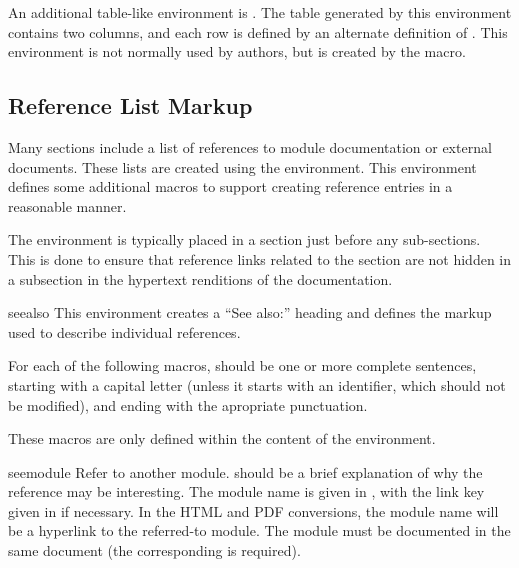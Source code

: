 \documentclass{howto}
\begin{document}
    An additional table-like environment is .  The
    table generated by this environment contains two columns, and each
    row is defined by an alternate definition of
    .  This environment is not normally used by
    authors, but is created by the  macro.


  \subsection{Reference List Markup \label{references}}

    Many sections include a list of references to module documentation
    or external documents.  These lists are created using the
     environment.  This environment defines some
    additional macros to support creating reference entries in a
    reasonable manner.

    The  environment is typically placed in a section
    just before any sub-sections.  This is done to ensure that
    reference links related to the section are not hidden in a
    subsection in the hypertext renditions of the documentation.

    \begin{envdesc}{seealso}{}
      This environment creates a ``See also:'' heading and defines the
      markup used to describe individual references.
    \end{envdesc}

    For each of the following macros,  should be one or more
    complete sentences, starting with a capital letter (unless it
    starts with an identifier, which should not be modified), and
    ending with the apropriate punctuation.

    These macros are only defined within the content of the
     environment.

    \begin{macrodesc}{seemodule}{}
      Refer to another module.   should be a brief
      explanation of why the reference may be interesting.  The module
      name is given in , with the link key given in
       if necessary.  In the HTML and PDF conversions, the
      module name will be a hyperlink to the referred-to module.
        The module must be documented in the same
      document (the corresponding  is required).
    \end{macrodesc}
\end{document}
